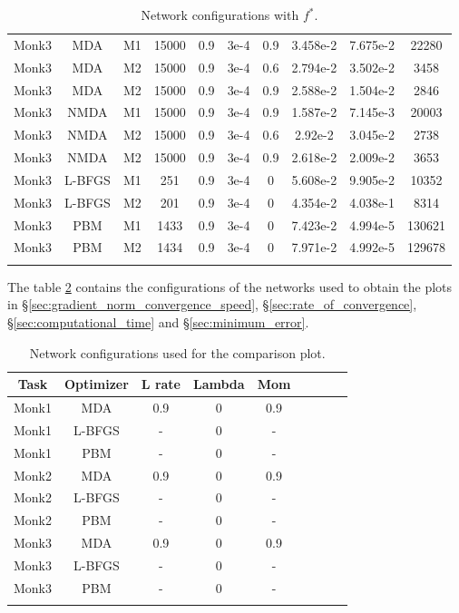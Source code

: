 \begin{center}
\begin{longtable}{|c|c|c|c|c|c|c|c|c|c|}
			Monk3 & MDA & M1 & 15000 & 0.9 & 3e-4  & 0.9 & 3.458e-2 & 7.675e-2 & 22280 \\
			Monk3 & MDA & M2 & 15000 & 0.9 & 3e-4  & 0.6 & 2.794e-2 & 3.502e-2 & 3458 \\
			Monk3 & MDA & M2 & 15000 & 0.9 & 3e-4  & 0.9 &  2.588e-2 & 1.504e-2 & 2846  \\
			Monk3 & NMDA & M1 & 15000 & 0.9 & 3e-4  & 0.9 & 1.587e-2 & 7.145e-3 & 20003 \\
			Monk3 & NMDA & M2 & 15000 & 0.9 & 3e-4  & 0.6 & 2.92e-2 & 3.045e-2 & 2738 \\
			Monk3 & NMDA & M2 & 15000 & 0.9 & 3e-4  & 0.9 & 2.618e-2 & 2.009e-2 & 3653 \\
			Monk3 & L-BFGS & M1 & 251 & 0.9 & 3e-4  & 0 & 5.608e-2 & 9.905e-2 & 10352 \\
			Monk3 & L-BFGS & M2 & 201 & 0.9 & 3e-4  & 0 & 4.354e-2 & 4.038e-1 & 8314 \\
			Monk3 & PBM & M1 & 1433 & 0.9 & 3e-4  & 0 & 7.423e-2 & 4.994e-5 & 130621 \\
			Monk3 & PBM & M2 & 1434 & 0.9 & 3e-4  & 0 & 7.971e-2 & 4.992e-5 & 129678  \\
			\hline
			\caption{Network configurations with $f^*$.}
			\label{tab:nets_res}
		\end{longtable}

\end{center}

The table \ref{tab:nets_comp} contains the configurations of the networks used to obtain the plots in \S \ref{sec:gradient_norm_convergence_speed}, \S \ref{sec:rate_of_convergence}, \S \ref{sec:computational_time} and \S \ref{sec:minimum_error}. 

\begin{center}
	\small\addtolength{\tabcolsep}{-3pt}
	\centering
	\begin{longtable}{|c|c|c|c|c|c|c|c|c|}
		\hline
		\textbf{Task}& \textbf{Optimizer} & \textbf{L rate} & \multicolumn{1}{l|}{\textbf{Lambda}} & \textbf{Mom}  \\ \hline 
		Monk1 & MDA & 0.9 & 0 & 0.9    \\
		Monk1 & L-BFGS & - & 0 & -    \\
		Monk1 & PBM & - & 0 & -    \\
		Monk2 & MDA & 0.9 & 0 & 0.9    \\
		Monk2 & L-BFGS & - & 0 & -    \\
		Monk2 & PBM & - & 0 & -    \\
		Monk3 & MDA & 0.9 & 0 & 0.9    \\
		Monk3 & L-BFGS & - & 0 & -    \\
		Monk3 & PBM & - & 0 & -    \\
		\hline
		\caption{Network configurations used for the comparison plot.}
		\label{tab:nets_comp}
	\end{longtable}
\end{center}


